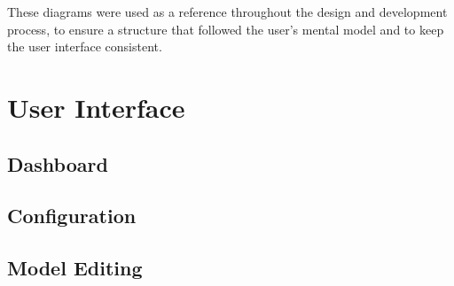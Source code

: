 These diagrams were used as a reference throughout the design and development process, to ensure a structure that followed the user's mental model and to keep the user interface consistent.

\section{User Interface}

\subsection{Dashboard}

\subsection{Configuration}

\subsection{Model Editing}